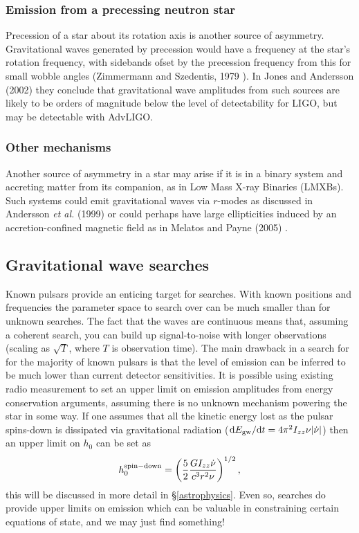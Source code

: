 \subsubsection{Emission from a precessing neutron star}
Precession of a star about its rotation axis is another source of asymmetry. Gravitational waves
generated by precession would have a frequency at the star's rotation frequency, with sidebands
ofset by the precession frequency from this for small wobble angles (Zimmermann and Szedentis, 1979
\cite{Zimmermann:1979}). In Jones and Andersson (2002) \cite{JonesAndersson:2002} they conclude that
gravitational wave amplitudes from such sources are likely to be orders of magnitude below the level
of detectability for LIGO, but may be detectable with AdvLIGO.

\subsubsection{Other mechanisms}
Another source of asymmetry in a star may arise if it is in a binary system and accreting matter
from its companion, as in Low Mass X-ray Binaries (LMXBs). Such systems could emit gravitational
waves via $r$-modes as discussed in Andersson {\it et al.} (1999) \cite{Andersson:1999} or could
perhaps have large ellipticities induced by an accretion-confined magnetic field as in Melatos and
Payne (2005) \cite{MelatosPayne:2005}.

\subsection{Gravitational wave searches}
Known pulsars provide an enticing target for \gw searches. With known positions and frequencies the
parameter space to search over can be much smaller than for unknown searches. The fact that the
waves are continuous means that, assuming a coherent search, you can build up signal-to-noise with
longer observations (scaling as $\sqrt{T}$, where $T$ is observation time). The main drawback in
a search for \gws for the majority of known pulsars is that the level of emission can be inferred
to be much lower than current detector sensitivities. It is possible using existing radio
measurement to set an upper limit on \gw emission amplitudes from energy conservation arguments,
assuming there is no unknown mechanism powering the star in some way. If one assumes that
all the kinetic energy lost as the pulsar spins-down is dissipated via gravitational radiation
(${\rm{d}}E_{\rm{gw}}/{\rm{d}}t = 4\pi^2I_{zz}\nu|\dot{\nu}|$) then an upper limit on $h_0$ can be
set as
\begin{equation}\label{spindownUL}
h_0^{\rm{spin-down}} = \left(\frac{5}{2}\frac{GI_{zz}\dot{\nu}}{c^3r^2\nu}\right)^{1/2},
\end{equation}
this will be discussed in more detail in \S\ref{astrophysics}. Even so, searches do provide upper
limits on emission which can be valuable in constraining certain equations of state, and we may just
find something!
 

